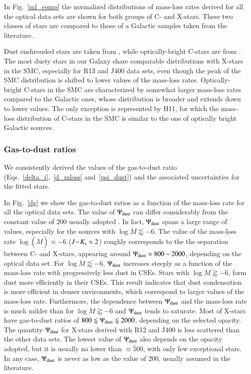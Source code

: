 \documentclass[useAMS,usenatbib]{mn2e/mn2e}
\newcommand{\jks}{\mbox{$J\!-\!K_{\rm s}$}}
\begin{document}
In Fig.~\ref{ml_comp} the normalized distributions of mass-loss rates derived for all the optical data sets are shown for both groups of C- and X-stars. These two classes of stars are compared to those of a Galactic samples taken from the literature. {Dust enshrouded stars are taken from \citet{Groenewegen02}, while optically-bright C-stars are from \citep{Schoier01}.
The most dusty stars in our Galaxy share comparable distributions with X-stars in the SMC, especially for R13 and J400 data sets, even though the peak of the SMC distribution is shifted to lower values of the mass-loss rates.
Optically-bright C-stars in the SMC are characterized by somewhat larger mass-loss rates compared to the Galactic ones, whose distribution is broader and extends down to lower values. The only exception is represented by H11, for which the mass-loss distribution of C-stars in the SMC is similar to the one of optically bright Galactic sources.

\subsubsection{Gas-to-dust ratios}\label{sec:dtg}
We consistently derived the values of the gas-to-dust ratio (Eqs.~\ref{delta_i},~\ref{d_mloss} and~\ref{psi_dust}) and the associated uncertainties for the fitted stars.

In Fig.~\ref{dg} we show the gas-to-dust ratios as a function of the mass-loss rate for all the optical data sets. The value of $\Psi_{\rm dust}$ can differ considerably from the constant value of $200$ usually adopted \citep{Groenewegen06, Groenewegen07, Groenewegen09, Gullieuszik12, Boyer12, Srinivasan16}.
In fact, $\Psi_{\rm dust}$ spans a large range of values, especially for the sources with $\log\dot{M}\lessapprox-6$.
The value of the mass-loss rate $\log(\dot{M})\approx-6$ ($\jks\approx 2$) roughly corresponds to the the separation between C- and X-stars, appearing around $\Psi_{\rm dust}\approx 800-2000$, depending on the optical data set.
For $\log\dot{M}\lessapprox-6$, $\Psi_{\rm dust}$ increases steeply as a function of the mass-loss rate with progressively less dust in CSEs.
Stars with $\log\dot{M}\gtrapprox -6$, form dust more efficiently in their CSEs. This result indicates that dust condensation is more efficient in denser environments, which correspond to larger values of the mass-loss rate. Furthermore, the dependence between $\Psi_{\rm dust}$ and the mass-loss rate is much milder than for $\log\dot{M}\gtrapprox-6$ and $\Psi_{\rm dust}$ tends to saturate.
Most of X-stars have gas-to-dust ratios of $800\lessapprox\Psi_{\rm dust}\lessapprox2000$, depending on the selected opacity.
The quantity $\Psi_{\rm dust}$ for X-stars derived with R12 and J400 is less scattered than the other data sets. The lowest value of $\Psi_{\rm dust}$ also depends on the opacity adopted, but it is usually no lower than $\approx 500$, with only few exceptional stars. In any case, $\Psi_{\rm dust}$ is never as low as the value of 200, usually assumed in the literature.

}
\end{document}
